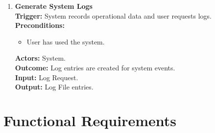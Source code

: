 \documentclass[12pt]{article}
\begin{document}
\begin{enumerate}[label={\bf PUC \arabic*:}, wide=0pt, font=\itshape]
  \item \textbf{Generate System Logs} \\[2mm]
    \textbf{Trigger:} System records operational data and user requests logs. \\[2mm]
    \textbf{Preconditions:}
    \begin{itemize}
      \item User has used the system.
    \end{itemize}
    \textbf{Actors:} System. \\
    \textbf{Outcome:} Log entries are created for system events. \\
    \textbf{Input:} Log Request. \\
    \textbf{Output:} Log File entries.

\end{enumerate}

\section{Functional Requirements}
\end{document}
